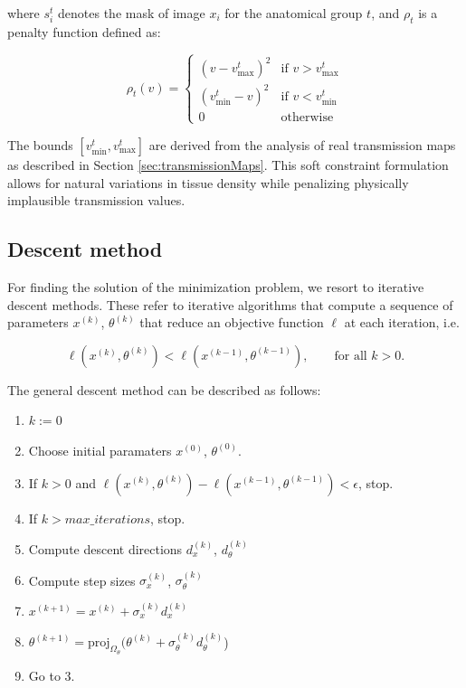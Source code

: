 \documentclass[nomenclature, english, bibtex]{kththesis}
\numberwithin{listing}{chapter}
\begin{document}
\begin{description}
    where $s_i^t$ denotes the mask of image $x_i$ for the anatomical group $t$, and $\rho_t$ is a penalty function defined as:

    \begin{equation}
        \rho_t(v) = \begin{cases}
            (v - v_{\max}^t)^2 & \text{if } v > v_{\max}^t \\
            (v_{\min}^t - v)^2 & \text{if } v < v_{\min}^t \\
            0 & \text{otherwise}
        \end{cases}
    \end{equation}

    The bounds $[v_{\min}^t, v_{\max}^t]$ are derived from the analysis of real transmission maps as described in Section
    \ref{sec:transmissionMaps}. This soft constraint formulation allows for natural variations in tissue density while penalizing
    physically implausible transmission values.
\end{description}

\subsection{Descent method}

For finding the solution of the minimization problem, we resort to iterative descent methods. These refer to
iterative algorithms that compute a sequence of parameters $x^{(k)}$, $\theta^{(k)}$ that reduce an
objective function $\ell$ at each iteration, i.e.

\begin{equation}
    \ell(x^{(k)}, \theta^{(k)}) <  \ell(x^{(k - 1)}, \theta^{(k - 1)}), \qquad \text{for all } k > 0.
\end{equation}

The general descent method can be described as follows:

\begin{enumerate}
    \item $k := 0$
    \item Choose initial paramaters $x^{(0)}$, $\theta^{(0)}$.
    \item If $k > 0$ and $\ell(x^{(k)}, \theta^{(k)}) - \ell(x^{(k - 1)}, \theta^{(k - 1)}) < \epsilon$, stop.
    \item If $k > max\_iterations$, stop.
    \item Compute descent directions $d_x^{(k)}$, $d_\theta^{(k)}$
    \item Compute step sizes $\sigma_x^{(k)}$, $\sigma_\theta^{(k)}$
    \item $x^{(k + 1)} = x^{(k)} + \sigma_x^{(k)} d_x^{(k)}$
    \item $\theta^{(k + 1)} = \mathrm{proj}_{\Omega_\theta}(\theta^{(k)} + \sigma_\theta^{(k)} d_\theta^{(k)}$)
    \item Go to 3.
\end{enumerate}
\end{document}
